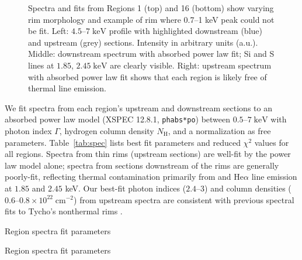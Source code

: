 \documentclass[iop, apj, numberedappendix, twocolappendix]{emulateapj}
\newcommand*{\mt}{\mathrm}
\newcommand*{\unit}[1]{\;\mt{#1}}  %
\begin{document}
\begin{figure*}
    \caption{Spectra and fits from Regions 1 (top) and 16 (bottom) show varying
    rim morphology and example of rim where 0.7--1 keV peak could not be fit.
    Left: $4.5$--$7 \unit{keV}$ profile with highlighted downstream (blue) and
    upstream (grey) sections.  Intensity in arbitrary units (a.u.).  Middle:
    downstream spectrum with absorbed power law fit; Si and S lines at $1.85$,
    $2.45 \unit{keV}$ are clearly visible.  Right: upstream spectrum with
    absorbed power law fit shows that each region is likely free of thermal
    line
emission.}
    \label{fig:spec}
\end{figure*}

We fit spectra from each region's upstream and downstream sections to an
absorbed power law model (XSPEC 12.8.1, \texttt{phabs*po}) between $0.5$--$7
\unit{keV}$ with photon index $\Gamma$, hydrogen column density $N_{\mt{H}}$,
and a normalization as free parameters.  Table~\ref{tab:spec} lists best fit
parameters and reduced $\chi^2$ values for all regions.  Spectra from thin rims
(upstream sections) are well-fit by the power law model alone; spectra from
sections downstream of the rims are generally poorly-fit, reflecting thermal
contamination primarily from  and  He$\alpha$ line
emission at $1.85$ and $2.45$ keV.  Our best-fit photon indices ($2.4$--$3$)
and column densities ($0.6$--$0.8 \times 10^{22} \unit{cm^{-2}}$) from upstream
spectra are consistent with previous spectral fits to Tycho's nonthermal rims
\citep{hwang2002, cassam-chenai2007}.

\begin{table}
    \scriptsize
    \centering
    \caption{Region spectra fit parameters\label{tab:spec}}
    
\end{table}

\begin{table*}
    \footnotesize
    \centering
    \caption{Region spectra fit parameters\label{tab:spec-pt2}}
    
\end{table*}

\end{document}
